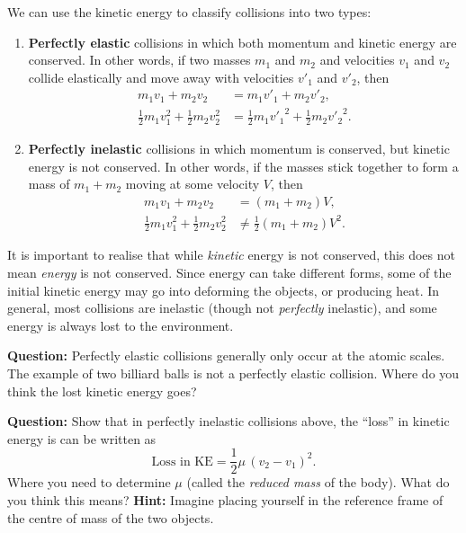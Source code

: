 We can use the kinetic energy to classify collisions into two types:
\begin{enumerate}
 \item \textbf{Perfectly elastic} collisions in which both momentum and kinetic energy are conserved. In other words, if two masses $m_1$ and $m_2$ and velocities $v_1$ and $v_2$ collide elastically and move away with velocities $v'_1$ and $v'_2$, then
 \begin{equation}
 \begin{aligned}
     m_1 v_1 + m_2 v_2 &= m_1 v'_1 + m_2 v'_2,\\
    \frac{1}{2}m_1 v_1^2 + \frac{1}{2} m_2 v_2^2 &= \frac{1}{2}m_1 {v'_1}^2 + \frac{1}{2} m_2 {v'_2}^2.
 \end{aligned}
 \end{equation}
 \item  \textbf{Perfectly inelastic} collisions in which momentum is conserved, but kinetic energy is not conserved. In other words, if the masses stick together to form a mass of $m_1 + m_2$ moving at some velocity $V$, then
 \begin{equation}
 \begin{aligned}
     m_1 v_1 + m_2 v_2 &= (m_1 + m_2)V,\\
    \frac{1}{2}m_1 v_1^2 + \frac{1}{2} m_2 v_2^2 &\neq \frac{1}{2}(m_1+m_2) V^2.
 \end{aligned}
 \end{equation}
\end{enumerate}

\begin{imp}
It is important to realise that while \textsl{kinetic} energy is not conserved, this does not mean \textsl{energy} is not conserved. Since energy can take different forms, some of the initial kinetic energy may go into deforming the objects, or producing heat. In general, most collisions are inelastic (though not \textsl{perfectly} inelastic), and some energy is always lost to the environment.
\end{imp}

\begin{question}
 \textbf{Question:} Perfectly elastic collisions generally only occur at the atomic scales. The example of two billiard balls is not a perfectly elastic collision. Where do you think the lost kinetic energy goes?
 
 \textbf{Question:} Show that in perfectly inelastic collisions above, the ``loss'' in kinetic energy is can be written as 
 \begin{equation}
     \text{Loss in KE} = \frac{1}{2} \mu \, (v_2 - v_1)^2.
 \end{equation}
 Where you need to determine $\mu$ (called the \textsl{reduced mass} of the body). What do you think this means? 
\textbf{Hint:} Imagine placing yourself in the reference frame of the centre of mass of the two objects.
\end{question}




